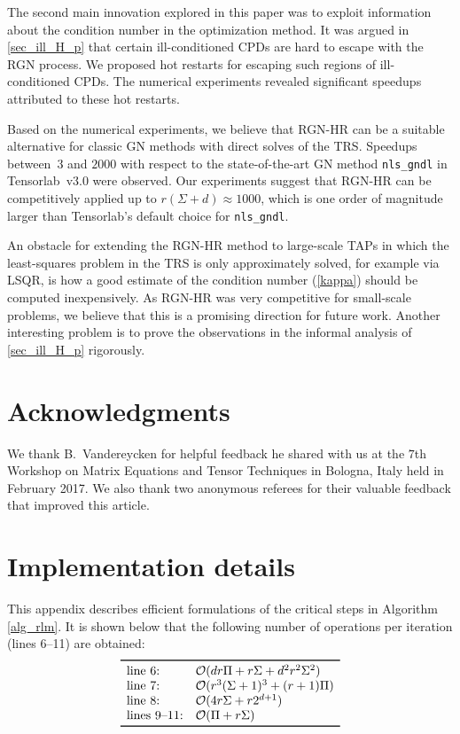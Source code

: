 \documentclass[a4paper,10pt,final]{siamart1116}
\newcommand{\refeqn}[1]{{(\ref{#1})}}
\newcommand{\refalg}[1]{Algorithm \ref{#1}}
\newcommand{\refsec}[1]{{\cref{#1}}}
\numberwithin{equation}{section}
\numberwithin{figure}{section}
\numberwithin{table}{section}
\numberwithin{theorem}{section}
\begin{document}
The second main innovation explored in this paper was to exploit information about the condition number in the optimization method. It was argued in \refsec{sec_ill_H_p} that certain ill-conditioned CPDs are hard to escape with the RGN process. We proposed hot restarts for escaping such regions of ill-conditioned CPDs. The numerical experiments revealed significant speedups attributed to these hot restarts.

Based on the numerical experiments, we believe that RGN-HR can be a suitable alternative for classic GN methods with direct solves of the TRS. Speedups between~$3$ and $2000$ with respect to the state-of-the-art GN method \texttt{nls\_gndl} in Tensorlab~v3.0 \cite{Tensorlab} were observed. Our experiments suggest that RGN-HR can be competitively applied up to $r(\Sigma+d) \approx 1000$, which is one order of magnitude larger than Tensorlab's default choice for \texttt{nls\_gndl}.

An obstacle for extending the RGN-HR method to large-scale TAPs in which the least-squares problem in the TRS is only approximately solved, for example via LSQR, is how a good estimate of the condition number \refeqn{kappa} should be computed inexpensively. As RGN-HR was very competitive for small-scale problems, we believe that this is a promising direction for future work. Another interesting problem is to prove the observations in the informal analysis of \refsec{sec_ill_H_p} rigorously.

\section*{Acknowledgments}
We thank B.~Vandereycken for helpful feedback he shared with us at the $7$th Workshop on Matrix Equations and Tensor Techniques in Bologna, Italy held in February 2017. We also thank two anonymous referees for their valuable feedback that improved this article.


% 

\appendix
\addtolength{\abovedisplayskip}{-1.75pt}
\addtolength{\belowdisplayskip}{-1.75pt}


\section{Implementation details}\label{app_implementation}
This appendix describes efficient formulations of the critical steps in \refalg{alg_rlm}. It is shown below that the following number of operations per iteration (lines 6--11) are obtained:
\begin{equation*}
\begin{array}{ll}
\toprule
\text{line 6:} & \mathcal{O}(dr\Pi + r\Sigma + d^2 r^2 \Sigma^2) \\
\text{line 7:} & \mathcal{O}( r^3 (\Sigma+1)^3 + (r+1)\Pi ) \\
\text{line 8:} & \mathcal{O}(4r\Sigma + r 2^{d+1}) \\
\text{lines 9--11:} & \mathcal{O}(\Pi + r\Sigma) \\
\bottomrule
\end{array}
\end{equation*}
\vspace{.1em}
\end{document}
